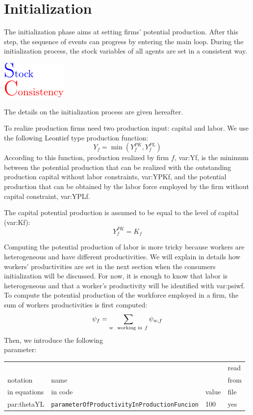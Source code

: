 \documentclass{book}
\begin{document}
\clearpage
\section{Initialization}\label{sec:initialization}
The initialization phase aims at setting firms' potential production.  %
After this step,  
the sequence of events can progress by entering the main loop. During the initialization process, the stock variables of all agents are set in a consistent way.\begin{marginfigure}
	\hskip1cm\includegraphics[scale=1.0]{sc_logo-0.pdf}
\end{marginfigure}


The details on the initialization process are given hereafter.

\label{pg:inputs1}
To realize production firms need two production input: capital and labor. We use the following Leontief type production function:
\begin{equation}
Y_f=\min(Y_f^{PK},Y_f^{PL})
	\label{eq:production_function}
\end{equation}
According to this function, production realized by firm $f$, \gls{var:Yf}, is the minimum between the potential production that can be realized with the outstanding production capital without labor constraints, \gls{var:YPKf}, and the potential production that can be obtained by the labor force employed by the firm without capital constraint, \gls{var:YPLf}. 


The capital potential production is assumed to be equal to the level of capital (\gls{var:Kf}):
\[
	Y^{PK}_f=K_f
\]

Computing the potential production of labor is more tricky because workers are heterogeneous and have different productivities. 
We will explain in details how workers' productivities are set in the next section when the consumers initialization will be discussed. For now, it is enough to know that labor is heterogeneous and that a worker's productivity will be identified with \gls{var:psiwf}.  To compute the potential production of the workforce employed in a firm, the sum of workers productivities is first computed:
\[
	\psi_f=\sum_{w \ \textnormal{ working in} \ f}\psi_{w,f}
\]
Then, we introduce the following\\ 
parameter:\\
\begin{tabular}{l l l l}
	\hline
	& &&read\\
	notation& name &&from\\
	in equations& in code&value&file\\
	\hline
	\hline
	\gls{par:thetaYL}&\verb+parameterOfProductivityInProductionFuncion+&100&yes\\
	\hline
\end{tabular}
\end{document}
